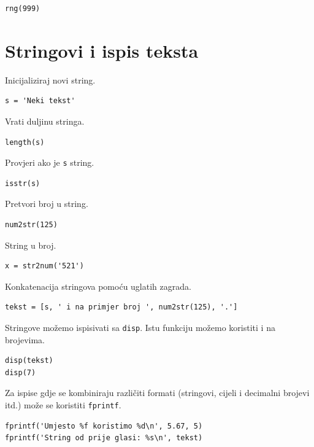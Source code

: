 \documentclass[a4paper, 10pt]{article}
\begin{document}
\begin{lstlisting}
rng(999)
\end{lstlisting}


\section{Stringovi i ispis teksta}

Inicijaliziraj novi string.

\begin{lstlisting}
s = 'Neki tekst'
\end{lstlisting}

Vrati duljinu stringa.

\begin{lstlisting}
length(s)
\end{lstlisting}

Provjeri ako je \texttt{s} string.

\begin{lstlisting}
isstr(s)
\end{lstlisting}

Pretvori broj u string.

\begin{lstlisting}
num2str(125)
\end{lstlisting}

String u broj.

\begin{lstlisting}
x = str2num('521')
\end{lstlisting}

Konkatenacija stringova pomoću uglatih zagrada.

\begin{lstlisting}
tekst = [s, ' i na primjer broj ', num2str(125), '.']
\end{lstlisting}

Stringove možemo ispisivati sa \texttt{disp}.
Istu funkciju možemo koristiti i na brojevima.

\begin{lstlisting}
disp(tekst)
disp(7)
\end{lstlisting}

Za ispise gdje se kombiniraju različiti formati (stringovi, cijeli i decimalni brojevi itd.) može se koristiti \texttt{fprintf}.

\begin{lstlisting}
fprintf('Umjesto %f koristimo %d\n', 5.67, 5)
fprintf('String od prije glasi: %s\n', tekst)
\end{lstlisting}
\end{document}
